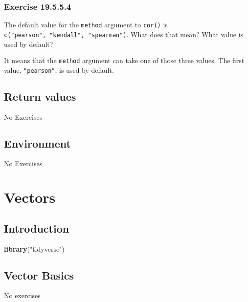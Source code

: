 \documentclass[]{book}
\newenvironment{Shaded}{\begin{snugshade}}{\end{snugshade}}
\newcommand{\KeywordTok}[1]{\textcolor[rgb]{0.13,0.29,0.53}{\textbf{#1}}}
\newcommand{\NormalTok}[1]{#1}
\newcommand{\StringTok}[1]{\textcolor[rgb]{0.31,0.60,0.02}{#1}}
\theoremstyle{plain}
\theoremstyle{remark}
\begin{document}
\hypertarget{exercise-19.5.5.4}{%
\subsection*{\texorpdfstring{Exercise
{19.5.5.4}}{Exercise 19.5.5.4}}\label{exercise-19.5.5.4}}

The default value for the \texttt{method} argument to \texttt{cor()} is
\texttt{c("pearson",\ "kendall",\ "spearman")}. What does that mean?
What value is used by default?

It means that the \texttt{method} argument can take one of those three
values. The first value, \texttt{"pearson"}, is used by default.

\hypertarget{return-values}{%
\section{Return values}\label{return-values}}

No Exercises

\hypertarget{environment}{%
\section{Environment}\label{environment}}

No Exercises

\hypertarget{vectors}{%
\chapter{Vectors}\label{vectors}}

\hypertarget{introduction-13}{%
\section{Introduction}\label{introduction-13}}

\begin{Shaded}
\begin{Highlighting}[]
\KeywordTok{library}\NormalTok{(}\StringTok{"tidyverse"}\NormalTok{)}
\end{Highlighting}
\end{Shaded}

\hypertarget{vector-basics}{%
\section{Vector Basics}\label{vector-basics}}

No exercises
\end{document}
